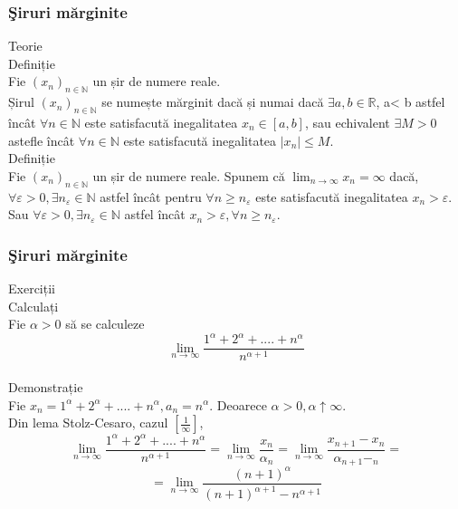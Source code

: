 \documentclass{beamer}
\theoremstyle{plain}
\begin{document}
\frame
{
\frametitle{\c Siruri m\u arginite}
Teorie 
\\ Definiție 
\\ Fie \((x_{n})_{n\in \mathbb{N}}\) un șir de numere reale. 
\\ Șirul \((x_{n})_{n\in \mathbb{N}}\) se numește mărginit dacă și numai dacă \(\exists  a, b \in \mathbb{R}\), a< b astfel încât \(\forall n\in \mathbb{N}\) este satisfacută inegalitatea \(x_{n}\in \left [ a,b \right ]\), sau echivalent \(\exists M> 0\) astefle încât \(\forall  n\in \mathbb{N}\) este satisfacută inegalitatea \(\left | x_{n} \right |\leq M\).
\\ Definiție 
\\ Fie \((x_{n})_{n\in \mathbb{N}}\) un șir de numere reale. Spunem că \(\lim_{n \to \infty }x_{n}=\infty\) dacă, \(\forall \varepsilon > 0,\exists n_{\varepsilon }\in \mathbb{N}\) astfel încât pentru \(\forall n\geq n_{\varepsilon }\) este satisfacută inegalitatea \(x_{n}> \varepsilon\). 
\\Sau \(\forall \varepsilon > 0,\exists n_{\varepsilon }\in \mathbb{N}\) astfel încât \(x_{n}> \varepsilon ,\forall n\geq n_{\varepsilon }\). 

}
\frame
{
\frametitle{\c Siruri m\u arginite}
Exerciții
\\ Calculați
\\ Fie \(\alpha > 0\) să se calculeze 
\begin{displaymath}
 \lim_{n \to \infty }\frac{1^{\alpha }+2^{\alpha }+....+n^{\alpha }}{n^{\alpha +1}}
\end{displaymath}
\\ Demonstrație 
\\ Fie \(x_{n}=1^{\alpha }+2^{\alpha }+....+n^{\alpha },a_{n}= n^{\alpha }\).  Deoarece \(\alpha > 0 , \alpha \uparrow \infty\). 
\\ Din lema Stolz-Cesaro, cazul \(\left [ \frac{1}{\infty } \right ]\), 
\begin{displaymath}
 \lim_{n \to \infty }\frac{1^{\alpha }+2^{\alpha }+....+n^{\alpha }}{n^{\alpha +1}}=\lim_{n \to \infty }\frac{x_{n}}{\alpha _{n}}=\lim_{n \to \infty } \frac{x_{n+1}-x_{n}}{\alpha _{n+1}-_{n}}=
 
\end{displaymath}
\begin{displaymath}
 =\lim_{n \to \infty } \frac{\left ( n+1 \right )^{\alpha }}{\left ( n+1 \right )^{\alpha+1} -n^{\alpha +1}}
\end{displaymath}
}
\end{document}
